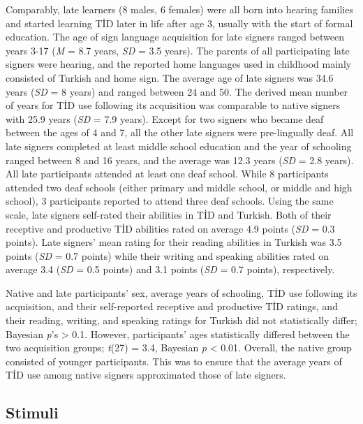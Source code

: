 \documentclass[]{elsarticle} %
\begin{document}
Comparably, late learners (8 males, 6 females) were all born into
hearing families and started learning TİD later in life after age 3,
usually with the start of formal education. The age of sign language
acquisition for late signers ranged between years 3-17 (\emph{M} = 8.7
years, \emph{SD} = 3.5 years). The parents of all participating late
signers were hearing, and the reported home languages used in childhood
mainly consisted of Turkish and home sign. The average age of late
signers was 34.6 years (\emph{SD} = 8 years) and ranged between 24 and
50. The derived mean number of years for TİD use following its
acquisition was comparable to native signers with 25.9 years (\emph{SD}
= 7.9 years). Except for two signers who became deaf between the ages of
4 and 7, all the other late signers were pre-lingually deaf. All late
signers completed at least middle school education and the year of
schooling ranged between 8 and 16 years, and the average was 12.3 years
(\emph{SD} = 2.8 years). All late participants attended at least one
deaf school. While 8 participants attended two deaf schools (either
primary and middle school, or middle and high school), 3 participants
reported to attend three deaf schools. Using the same scale, late
signers self-rated their abilities in TİD and Turkish. Both of their
receptive and productive TİD abilities rated on average 4.9 points
(\emph{SD} = 0.3 points). Late signers' mean rating for their reading
abilities in Turkish was 3.5 points (\emph{SD} = 0.7 points) while their
writing and speaking abilities rated on average 3.4 (\emph{SD} = 0.5
points) and 3.1 points (\emph{SD} = 0.7 points), respectively.

Native and late participants' sex, average years of schooling, TİD use
following its acquisition, and their self-reported receptive and
productive TİD ratings, and their reading, writing, and speaking ratings
for Turkish did not statistically differ; Bayesian \emph{p}'s
\textgreater{} 0.1. However, participants' ages statistically differed
between the two acquisition groups; \emph{t}(27) = 3.4, Bayesian
\emph{p} \textless{} 0.01. Overall, the native group consisted of
younger participants. This was to ensure that the average years of TİD
use among native signers approximated those of late signers.

\hypertarget{stimuli}{%
\subsection{Stimuli}\label{stimuli}}
\end{document}
